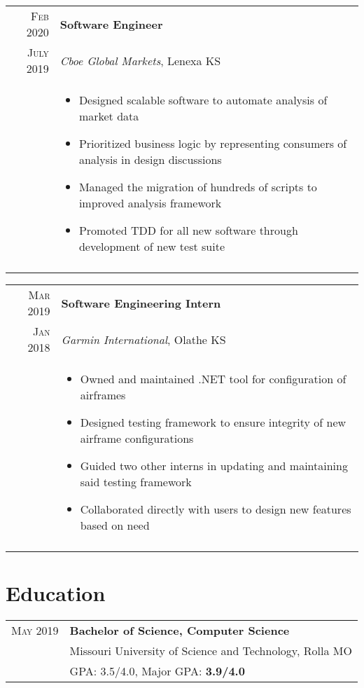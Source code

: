 \documentclass[a4paper,10pt]{article}
\newcommand{\br}{\\\multicolumn{2}{c}{}}
\begin{document}
\begin{tabular}{r|p{15cm}}
    \textsc{Feb 2020}   & \textbf{Software Engineer} \\
    \textsc{July 2019}  & \textit{Cboe Global Markets}, Lenexa KS \\ &
    \begin{itemize}
    \item Designed scalable software to automate analysis of market data
    \item Prioritized business logic by representing consumers of analysis in design discussions
    \item Managed the migration of hundreds of scripts to improved analysis framework
    \item Promoted TDD for all new software through development of new test suite

    \end{itemize} \br\\

\end{tabular}

\begin{tabular}{r|p{15cm}}
    \textsc{Mar 2019} & \textbf{Software Engineering Intern} \\
    \textsc{Jan 2018} & \textit{Garmin International}, Olathe KS \\ &
    \begin{itemize}
    \item Owned and maintained .NET tool for configuration of airframes
    \item Designed testing framework to ensure integrity of new airframe configurations
    \item Guided two other interns in updating and maintaining said testing framework
    \item Collaborated directly with users to design new features based on need
    \end{itemize} \br\\

\end{tabular}

\section{Education}
\begin{tabular}{r|p{15cm}}
    \textsc{May} 2019 & \textbf{Bachelor of Science, Computer Science} \\
                      & Missouri University of Science and Technology, Rolla MO  \\
                      & GPA: 3.5/4.0, Major GPA: \textbf{3.9/4.0} \\
\end{tabular}
\end{document}
